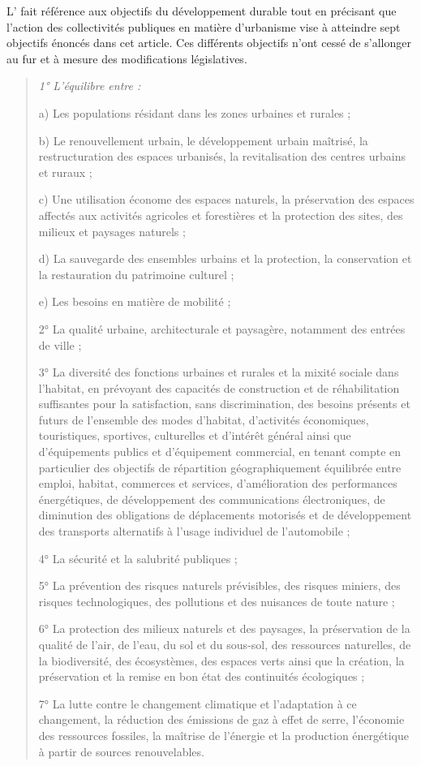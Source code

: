 			L' fait référence aux objectifs du développement durable tout en précisant que l'action des collectivités publiques en matière d'urbanisme vise à atteindre sept objectifs énoncés dans cet article. Ces différents objectifs n'ont cessé de s'allonger au fur et à mesure des modifications législatives.
			\begin{quote}
				\itshape
				1° L'équilibre entre :

				a) Les populations résidant dans les zones urbaines et rurales ;

				b) Le renouvellement urbain, le développement urbain maîtrisé, la restructuration des espaces urbanisés, la revitalisation des centres urbains et ruraux ;

				c) Une utilisation économe des espaces naturels, la préservation des espaces affectés aux activités agricoles et forestières et la protection des sites, des milieux et paysages naturels ;

				d) La sauvegarde des ensembles urbains et la protection, la conservation et la restauration du patrimoine culturel ;

				e) Les besoins en matière de mobilité ;

				2° La qualité urbaine, architecturale et paysagère, notamment des entrées de ville ;

				3° La diversité des fonctions urbaines et rurales et la mixité sociale dans l'habitat, en prévoyant des capacités de construction et de réhabilitation suffisantes pour la satisfaction, sans discrimination, des besoins présents et futurs de l'ensemble des modes d'habitat, d'activités économiques, touristiques, sportives, culturelles et d'intérêt général ainsi que d'équipements publics et d'équipement commercial, en tenant compte en particulier des objectifs de répartition géographiquement équilibrée entre emploi, habitat, commerces et services, d'amélioration des performances énergétiques, de développement des communications électroniques, de diminution des obligations de déplacements motorisés et de développement des transports alternatifs à l'usage individuel de l'automobile ;

				4° La sécurité et la salubrité publiques ;

				5° La prévention des risques naturels prévisibles, des risques miniers, des risques technologiques, des pollutions et des nuisances de toute nature ;

				6° La protection des milieux naturels et des paysages, la préservation de la qualité de l'air, de l'eau, du sol et du sous-sol, des ressources naturelles, de la biodiversité, des écosystèmes, des espaces verts ainsi que la création, la préservation et la remise en bon état des continuités écologiques ;

				7° La lutte contre le changement climatique et l'adaptation à ce changement, la réduction des émissions de gaz à effet de serre, l'économie des ressources fossiles, la maîtrise de l'énergie et la production énergétique à partir de sources renouvelables.
			\end{quote}


